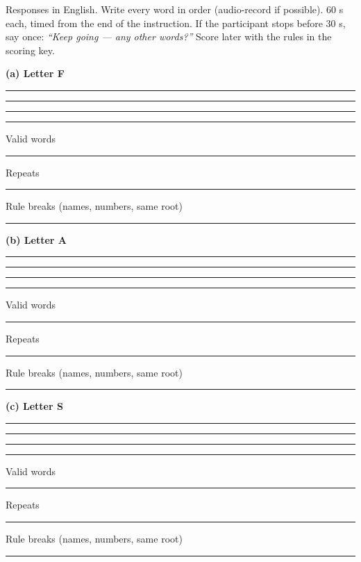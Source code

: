 \documentclass[10pt,a4paper]{article}
\newcommand{\blank}[1][1.2cm]{\rule{#1}{0.4pt}}
\begin{document}
Responses in English. Write every word in order (audio-record if possible). 60 s each, timed from the end of the instruction. If the participant stops before 30 s, say once: \textit{``Keep going --- any other words?''} Score later with the rules in the scoring key.
\par{}\medskip\textbf{(a) Letter F}\par\vspace{2pt}\blank[\linewidth]\par\vspace{9pt}\blank[\linewidth]\par\vspace{9pt}\blank[\linewidth]\par\vspace{9pt}\blank[\linewidth]\par\vspace{9pt}
Valid words \blank\quad Repeats \blank\quad Rule breaks (names, numbers, same root) \blank\par
\par{}\medskip\textbf{(b) Letter A}\par\vspace{2pt}\blank[\linewidth]\par\vspace{9pt}\blank[\linewidth]\par\vspace{9pt}\blank[\linewidth]\par\vspace{9pt}\blank[\linewidth]\par\vspace{9pt}
Valid words \blank\quad Repeats \blank\quad Rule breaks (names, numbers, same root) \blank\par
\par{}\medskip\textbf{(c) Letter S}\par\vspace{2pt}\blank[\linewidth]\par\vspace{9pt}\blank[\linewidth]\par\vspace{9pt}\blank[\linewidth]\par\vspace{9pt}\blank[\linewidth]\par\vspace{9pt}
Valid words \blank\quad Repeats \blank\quad Rule breaks (names, numbers, same root) \blank\par
\end{document}
